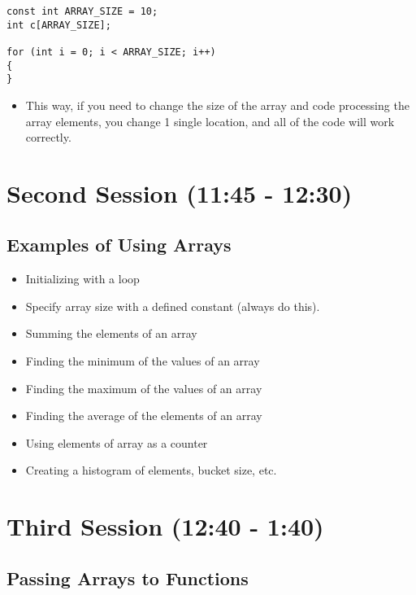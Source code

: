 \documentclass[11pt]{article}
\begin{document}
\begin{verbatim}
const int ARRAY_SIZE = 10;
int c[ARRAY_SIZE];

for (int i = 0; i < ARRAY_SIZE; i++)
{
}
\end{verbatim}

\begin{itemize}
\item This way, if you need to change the size of the array and code
processing the array elements, you change 1 single location, and all
of the code will work correctly.
\end{itemize}
\section{Second Session (11:45 - 12:30)}
\label{sec-2}
\subsection{Examples of Using Arrays}
\label{sec-2-1}
\begin{itemize}
\item Initializing with a loop
\item Specify array size with a defined constant (always do this).
\item Summing the elements of an array
\item Finding the minimum of the values of an array
\item Finding the maximum of the values of an array
\item Finding the average of the elements of an array
\item Using elements of array as a counter
\item Creating a histogram of elements, bucket size, etc.
\end{itemize}
\section{Third Session (12:40 - 1:40)}
\label{sec-3}
\subsection{Passing Arrays to Functions}
\label{sec-3-1}
\end{document}
